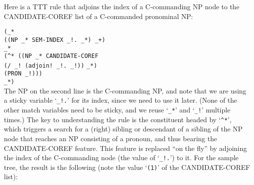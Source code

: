 \documentclass[a4,11pt]{article}
\begin{document}
\normalsize 
Here is a TTT rule that adjoins the index of a C-commanding NP node
to the CANDIDATE-COREF list of a C-commanded pronominal NP:

\scriptsize
\hspace*{0em}\texttt{(\_*}\\
\hspace*{2.5em}\texttt{((NP \_* SEM-INDEX \_!. \_*) \_+)}\\
\hspace*{2.5em}\texttt{\_*}\\
\hspace*{2.5em}\texttt{(\^{}* ((NP \_* CANDIDATE-COREF}\\
\hspace*{9.5em}\texttt{(/ \_!~(adjoin!~\_!. \_!))}
\hspace*{9.5em}\texttt{\_*)}\\
\hspace*{5.5em}\texttt{(PRON \_!)))}\\
\hspace*{2.5em}\texttt{\_*)}\\

\normalsize
The NP on the second line is the C-commanding NP, and note that we are
using a sticky variable `\texttt{\_!.}' for its index, since we need to use it
later. (None of the other match variables need to be sticky, and we reuse 
`\texttt{\_*}' and `\texttt{\_!}' multiple times.) The key to understanding 
the rule is the constituent headed by `\texttt{\^{}*}', which triggers a 
search for a (right) sibling or descendant of a sibling of the NP node that
reaches an NP consisting of a pronoun, and thus bearing the CANDIDATE-COREF
feature. This feature is replaced ``on the fly'' by adjoining the index
of the C-commanding node (the value of `\texttt{\_!.}') to it. For the 
sample tree, the result is the following (note the value `\texttt{(1)}' of 
the CANDIDATE-COREF list):
\end{document}
